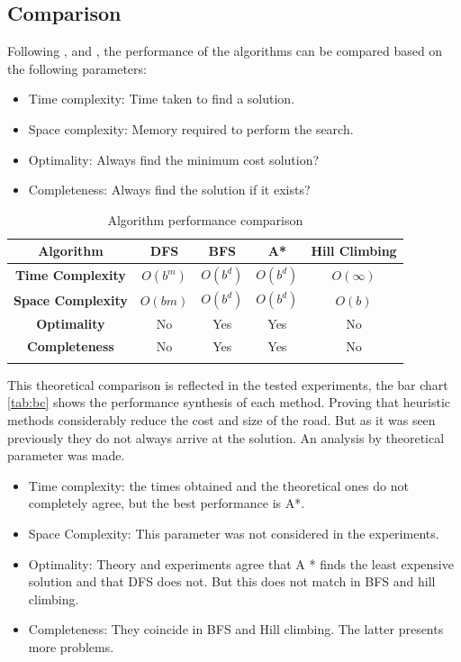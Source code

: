 \documentclass[11pt]{article}
\begin{document}
\subsection{Comparison}
Following \cite{Maharshi2018ComparativeAO}, \cite{HLweb} and \cite{stuart2003artificial}, the performance of the algorithms can be compared based on the following parameters:
\begin{itemize}
    \item Time complexity: Time taken to find a solution.
    \item Space complexity: Memory required to perform the search.
    \item Optimality: Always find the minimum cost solution?
    \item Completeness: Always find the solution if it exists?
\end{itemize}
\begin{longtable}[c]{|c|c|c|c|c|}
\hline
\textbf{Algorithm}        & \textbf{DFS} & \textbf{BFS} & \textbf{A*} & \textbf{Hill Climbing} \\ \hline
\endhead
%
\textbf{Time Complexity}  & $O(b^{m})$   & $O(b^{d})$   & $O(b^{d})$  & $O(\infty)$            \\ \hline
\textbf{Space Complexity} & $O(bm)$      & $O(b^{d})$   & $O(b^{d})$  & $O(b)$             \\ \hline
\textbf{Optimality}       & No           & Yes          & Yes         & No                     \\ \hline
\textbf{Completeness}     & No           & Yes          & Yes         & No                     \\ \hline
\caption{Algorithm performance comparison}
\label{tab:my-table}
\end{longtable}
This theoretical comparison is reflected in the tested experiments, the bar chart \ref{tab:bc} shows the performance synthesis of each method. Proving that heuristic methods considerably reduce the cost and size of the road. But as it was seen previously they do not always arrive at the solution. An analysis by theoretical parameter was made.
\begin{itemize}
    \item Time complexity: the times obtained and the theoretical ones do not completely agree, but the best performance is A*.
    \item Space Complexity: This parameter was not considered in the experiments.
    \item Optimality: Theory and experiments agree that A * finds the least expensive solution and that DFS does not. But this does not match in BFS and hill climbing.
    \item Completeness: They coincide in BFS and Hill climbing. The latter presents more problems.
\end{itemize}
\end{document}
